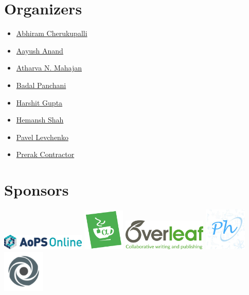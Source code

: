 \section*{Organizers}
\begin{multicols}{2}
\begin{itemize}
    \item \href{https://www.linkedin.com/in/abhiram-cherukupalli/}{Abhiram Cherukupalli}
    \item \href{https://www.linkedin.com/in/aayush-anand-043756203}{Aayush Anand}
    \item \href{https://www.linkedin.com/in/atharva-mahajan-5957b4212/}{Atharva N. Mahajan}
    \item \href{https://github.com/theblapse}{Badal Panchani}
    \item \href{https://www.instagram.com/harshitgupta3006/}{Harshit Gupta}
    \item \href{https://www.youtube.com/channel/UCzaW7ijJ-K9bsCwyCVawyxg}{Hemansh Shah}
    \item \href{https://www.linkedin.com/in/pavel-levchenko-a315041a7/}{Pavel Levchenko}
    \item \href{https://www.linkedin.com/in/prerak-contractor-77b68b223/}{Prerak Contractor}
\end{itemize}
\end{multicols}
\section*{Sponsors}
\begin{center}
    \href{https://artofproblemsolving.com/}{\includegraphics[width=4cm]{Images/sponsors/aops-online.png}}
    \href{https://mathcha.io/}{\includegraphics[height=2cm]{Images/sponsors/mathcha.png}}
    \href{https://overleaf.com/}{\includegraphics[width=4cm]{Images/sponsors/overleaf.png}}
    \href{https://physolymp.com/}{\includegraphics[width=2cm]{Images/sponsors/physolymp2.png}}
    \href{https://replit.com/}{\includegraphics[width=2cm]{Images/sponsors/replit.png}}
\end{center}
\clearpage